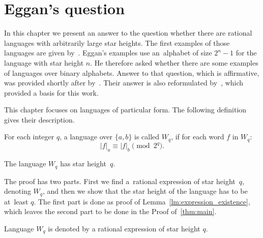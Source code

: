 \chapter{Eggan's question}

In this chapter we present an answer to the question whether there are rational languages with arbitrarily large star heights. The first examples of those languages are given by~\cite{Eggan63}.  Eggan's examples use an~alphabet of size $2^n - 1$ for the language with star height $n$. He therefore asked whether there are some examples of languages over binary alphabets. Answer to that question, which is affirmative, was provided shortly after by~\cite{DejeanSchutzenberger66}. Their answer is also reformulated by~\cite{Sakarovitch09}, which  provided a basis for this work.

This chapter focuses on languages of particular form. The following definition gives their description.

\begin{defn}
    For each integer $q$, a language over $\{a, b\}$ is called $W_q$, if for each word $f$ in $W_q$:
    \[
        |f|_a \equiv |f|_b \pmod{2^q}.
    \]
\end{defn}

\begin{thm}\label{thm:main}
    The language $W_q$ has star height~$q$.
\end{thm}

The proof has two parts. First we find a~rational expression of star height~$q$, denoting $W_q$, and then we show that the star height of the language has to be at~least $q$. The first part is done as proof of Lemma~\ref*{lm:expression_existence}, which leaves the second part to be done in the Proof of~\autoref*{thm:main}.

\begin{lemma}\label{lm:expression_existence}
    Language $W_q$ is denoted by a rational expression of star height $q$.
\end{lemma}


